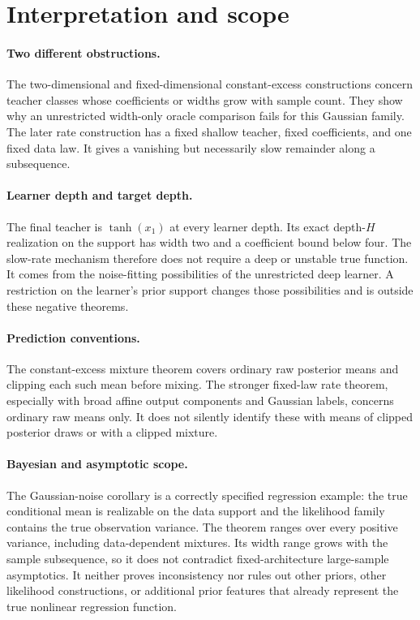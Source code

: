 \documentclass[11pt]{article}
\begin{document}










\section{Interpretation and scope}

\paragraph{Two different obstructions.}
The two-dimensional and fixed-dimensional constant-excess constructions concern teacher classes whose coefficients or widths grow with sample count. They show why an unrestricted width-only oracle comparison fails for this Gaussian family. The later rate construction has a fixed shallow teacher, fixed coefficients, and one fixed data law. It gives a vanishing but necessarily slow remainder along a subsequence.

\paragraph{Learner depth and target depth.}
The final teacher is $\tanh(x_1)$ at every learner depth. Its exact depth-$H$ realization on the support has width two and a coefficient bound below four. The slow-rate mechanism therefore does not require a deep or unstable true function. It comes from the noise-fitting possibilities of the unrestricted deep learner. A restriction on the learner's prior support changes those possibilities and is outside these negative theorems.

\paragraph{Prediction conventions.}
The constant-excess mixture theorem covers ordinary raw posterior means and clipping each such mean before mixing. The stronger fixed-law rate theorem, especially with broad affine output components and Gaussian labels, concerns ordinary raw means only. It does not silently identify these with means of clipped posterior draws or with a clipped mixture.

\paragraph{Bayesian and asymptotic scope.}
The Gaussian-noise corollary is a correctly specified regression example: the true conditional mean is realizable on the data support and the likelihood family contains the true observation variance. The theorem ranges over every positive variance, including data-dependent mixtures. Its width range grows with the sample subsequence, so it does not contradict fixed-architecture large-sample asymptotics. It neither proves inconsistency nor rules out other priors, other likelihood constructions, or additional prior features that already represent the true nonlinear regression function.
\end{document}
